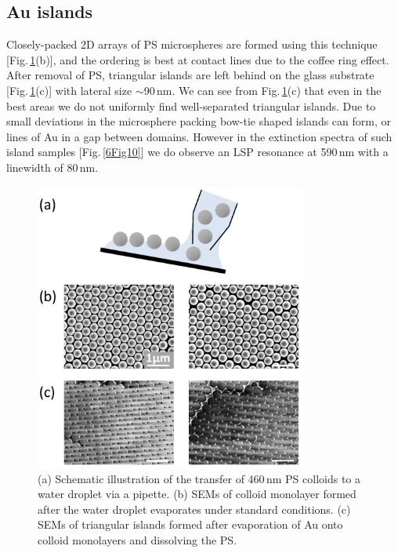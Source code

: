 \subsection{Au islands}
Closely-packed 2D arrays of PS microspheres are formed using this technique [Fig.\,\ref{6Fig9}(b)], and the ordering is best at contact lines due to the coffee ring effect. After removal of PS, triangular islands are left behind on the glass substrate [Fig.\,\ref{6Fig9}(c)] with lateral size $\sim$90\,nm. We can see from Fig.\,\ref{6Fig9}(c) that even in the best areas we do not uniformly find well-separated triangular islands. Due to small deviations in the microsphere packing bow-tie shaped islands can form, or lines of Au in a gap between domains. However in the extinction spectra of such island samples [Fig.\,\ref{6Fig10}] we do observe an LSP resonance at 590\,nm with a linewidth of 80\,nm.
\begin{figure}[ht] 
\centering    
\includegraphics[width=0.8\textwidth]{Fig9}
\caption{(a) Schematic illustration of the transfer of 460\,nm PS colloids to a water droplet via a pipette. (b) SEMs of colloid monolayer formed after the water droplet evaporates under standard conditions. (c) SEMs of triangular islands formed after evaporation of Au onto colloid monolayers and dissolving the PS.}
\label{6Fig9}
\end{figure}


